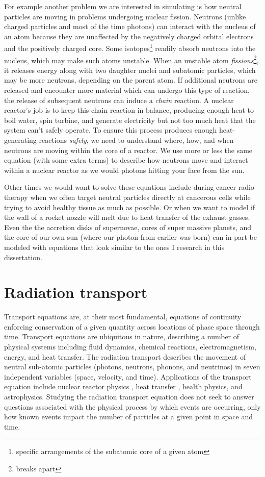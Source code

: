 For example another problem we are interested in simulating is how neutral particles are moving in problems undergoing nuclear fission.
Neutrons (unlike charged particles and most of the time photons) can interact with the nucleus of an atom because they are unaffected by the negatively charged orbital electrons and the positively charged core.
Some isotopes\footnote{specific arrangements of the subatomic core of a given atom} readily absorb neutrons into the nucleus, which may make such atoms unstable.
When an unstable atom \textit{fissions}\footnote{breaks apart}, it releases energy along with two daughter nuclei and subatomic particles, which may be more neutrons, depending on the parent atom.
If additional neutrons are released and encounter more material which can undergo this type of reaction, the release of subsequent neutrons can induce a \textit{chain} reaction.
A nuclear reactor's job is to keep this chain reaction in balance, producing enough heat to boil water, spin turbine, and generate electricity but not too much heat that the system can't safely operate.
To ensure this process produces enough heat-generating reactions \textit{safely}, we need to understand where, how, and when neutrons are moving within the core of a reactor.
We use more or less the same equation (with some extra terms) to describe how neutrons move and interact within a nuclear reactor as we would photons hitting your face from the sun.

Other times we would want to solve these equations include during cancer radio therapy when we often target  neutral particles directly at cancerous cells while trying to avoid healthy tissue as much as possible.
Or when we want to model if the wall of a rocket nozzle will melt due to heat transfer of the exhaust gasses.
Even the the accretion disks of supernovae, cores of super massive planets, and the core of our own sun (where our photon from earlier was born) can in part be modeled with equations that look similar to the ones I research in this dissertation.


\section{Radiation transport}

Transport equations are, at their most fundamental, equations of continuity enforcing conservation of a given quantity across locations of phase space through time.
Transport equations are ubiquitous in nature, describing a number of physical systems including fluid dynamics, chemical reactions, electromagnetism, energy, and heat transfer.
The radiation transport describes the movement of neutral sub-atomic particles (photons, neutrons, phonons, and neutrinos) in seven independent variables (space, velocity, and time).
Applications of the transport equation include nuclear reactor physics \cite{duderstadt_hamilton}, heat transfer \cite{radheattrans2003, chandrasekhar1960radiative}, health physics, and astrophysics.
Studying the radiation transport equation does not seek to answer questions associated with the physical process by which events are occurring, only how known events impact the number of particles at a given point in space and time.

